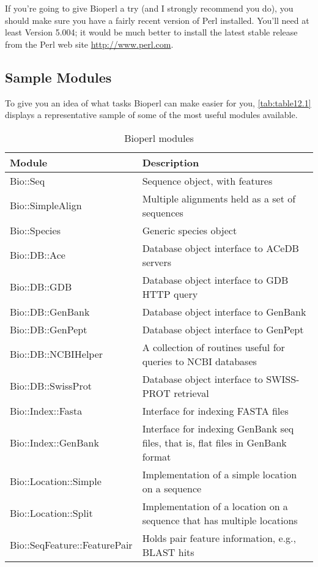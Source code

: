 If you're going to give Bioperl a try (and I strongly recommend you do), you should make sure you have a fairly recent version of Perl installed. You'll need at least Version 5.004; it would be much better to install the latest stable release from the Perl web site \href{http://www.perl.com}{http://www.perl.com}. 

\subsection{Sample Modules}
To give you an idea of what tasks Bioperl can make easier for you, \autoref{tab:table12.1} displays a representative sample of some of the most useful modules available. 

\begin{table}[!htbp]
  \begin{center}
  \caption{Bioperl modules}
  \label{tab:table12.1}
  \begin{tabu}{X[2,l]X[3,l]}
  \toprule
  Module & Description\\
  \midrule
  Bio::Seq & Sequence object, with features\\
  Bio::SimpleAlign & Multiple alignments held as a set of sequences\\
  Bio::Species & Generic species object\\
  Bio::DB::Ace & Database object interface to ACeDB servers\\
  Bio::DB::GDB & Database object interface to GDB HTTP query\\
  Bio::DB::GenBank & Database object interface to GenBank\\
  Bio::DB::GenPept & Database object interface to GenPept\\
  Bio::DB::NCBIHelper & A collection of routines useful for queries to NCBI databases\\
  Bio::DB::SwissProt & Database object interface to SWISS-PROT retrieval\\
  Bio::Index::Fasta & Interface for indexing FASTA files\\
  Bio::Index::GenBank & Interface for indexing GenBank seq files, that is, flat files in GenBank format\\
  Bio::Location::Simple & Implementation of a simple location on a sequence\\
  Bio::Location::Split & Implementation of a location on a sequence that has multiple locations\\
  Bio::SeqFeature::FeaturePair & Holds pair feature information, e.g., BLAST hits\\

\end{tabu}
\end{center}
\end{table}
